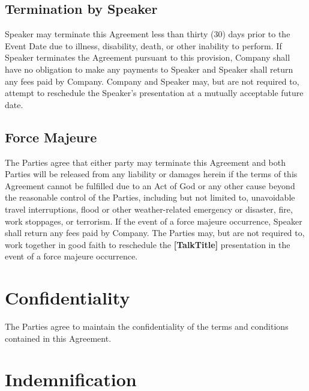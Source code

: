 \documentclass[a4paper,12pt]{article} %
\newcommand{\TalkTitle}{[TalkTitle]}
\begin{document}
\subsection{Termination by Speaker}

Speaker may terminate this Agreement less than thirty (30) days prior to the Event Date due to illness, disability, death, or other inability to perform. If Speaker terminates the Agreement pursuant to this provision, Company shall have no obligation to make any payments to Speaker and Speaker shall return any fees paid by Company. Company and Speaker may, but are not required to, attempt to reschedule the Speaker's presentation at a mutually acceptable future date.

\subsection{Force Majeure}

The Parties agree that either party may terminate this Agreement and both Parties will be released from any liability or damages herein if the terms of this Agreement cannot be fulfilled due to an Act of God or any other cause beyond the reasonable control of the Parties, including but not limited to, unavoidable travel interruptions, flood or other weather-related emergency or disaster, fire, work stoppages, or terrorism. If the event of a force majeure occurrence, Speaker shall return any fees paid by Company. The Parties may, but are not required to, work together in good faith to reschedule the \textbf{\TalkTitle} presentation in the event of a force majeure occurrence.



\section{Confidentiality}

The Parties agree to maintain the confidentiality of the terms and conditions contained in this Agreement.


\section{Indemnification}
\end{document}
